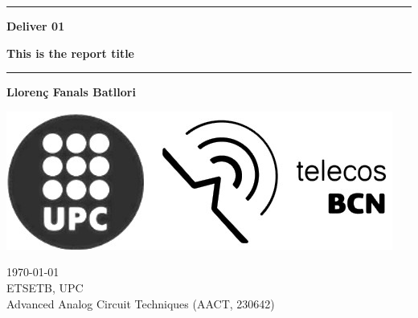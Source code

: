 \begin{titlepage}
	\begin{center}
		\vspace*{1cm} %
		
		\huge

	\hrule
		\textbf{Deliver 01} %
		\vspace{0.5cm}

		\Large
		\textbf{This is the report title}

		\vspace{0.5cm}
	\hrule
		
		\vspace{2.5cm}
		\Large

		\textbf{Llorenç Fanals Batllori}

		\vspace{-0.4cm}
		\texttt{\href{mailto:llorenc.fanals@estudiantat.upc.edu}{\color{black}{llorenc.fanals@estudiantat.upc.edu}}} %

		\vspace{4cm}
		\includegraphics[scale=0.35]{./titlepage/upc-telecos-bw.png}

		
		\vfill

	\end{center}
	
	\begin{flushright}
		\large	
		\UKvardate \today \\ %
		ETSETB, UPC \\ %
		Advanced Analog Circuit Techniques (AACT, 230642) %
	\end{flushright}

\end{titlepage} 
